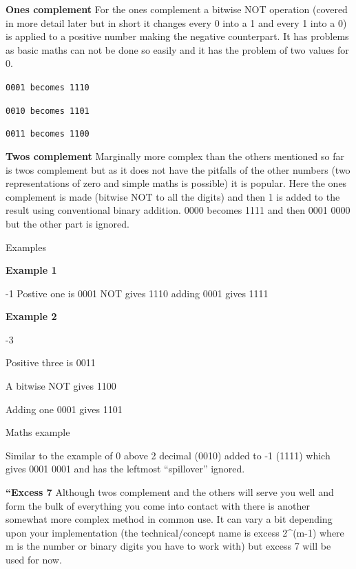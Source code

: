 \documentclass[
]{book}
\newenvironment{Shaded}{\begin{snugshade}}{\end{snugshade}}
\newcommand{\DecValTok}[1]{\textcolor[rgb]{0.00,0.00,0.81}{#1}}
\newcommand{\NormalTok}[1]{#1}
\newcommand{\SpecialCharTok}[1]{\textcolor[rgb]{0.00,0.00,0.00}{#1}}
\begin{document}
\textbf{Ones complement} For the ones complement a bitwise NOT operation (covered in more detail later but in short it changes every 0 into a 1 and every 1 into a 0) is applied to a positive number making the negative counterpart. It has problems as basic maths can not be done so easily and it has the problem of two values for 0.

\texttt{0001\ becomes\ 1110}

\texttt{0010\ becomes\ 1101}

\texttt{0011\ becomes\ 1100}

\textbf{Twos complement} Marginally more complex than the others mentioned so far is twos complement but as it does not have the pitfalls of the other numbers (two representations of zero and simple maths is possible) it is popular. Here the ones complement is made (bitwise NOT to all the digits) and then 1 is added to the result using conventional binary addition. 0000 becomes 1111 and then 0001 0000 but the other part is ignored.

Examples

\textbf{Example 1}

\begin{Shaded}
\begin{Highlighting}[]
\SpecialCharTok{{-}}\DecValTok{1}
\NormalTok{Postive one is }\DecValTok{0001}
\NormalTok{NOT gives }\DecValTok{1110}
\NormalTok{adding }\DecValTok{0001}\NormalTok{ gives }\DecValTok{1111}
\end{Highlighting}
\end{Shaded}

\textbf{Example 2}

\begin{Shaded}
\begin{Highlighting}[]
\SpecialCharTok{{-}}\DecValTok{3}

\NormalTok{Positive three is }\DecValTok{0011}

\NormalTok{A bitwise NOT gives }\DecValTok{1100}

\NormalTok{Adding one }\DecValTok{0001}\NormalTok{ gives }\DecValTok{1101}
\end{Highlighting}
\end{Shaded}

Maths example

Similar to the example of 0 above 2 decimal (0010) added to -1 (1111) which gives 0001 0001 and has the leftmost ``spillover'' ignored.

\textbf{``Excess 7} Although twos complement and the others will serve you well and form the bulk of everything you come into contact with there is another somewhat more complex method in common use. It can vary a bit depending upon your implementation (the technical/concept name is excess 2\^{}(m-1) where m is the number or binary digits you have to work with) but excess 7 will be used for now.
\end{document}
